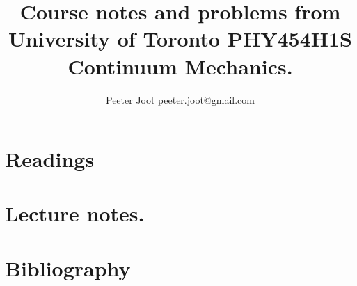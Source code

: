 \documentclass[12pt,leqno]{book}
\begin{document}

\title{Course notes and problems from\\University of Toronto PHY454H1S\\Continuum Mechanics.}
\author{Peeter Joot \quad peeter.joot@gmail.com}

\maketitle

\clearpage{}
\tableofcontents

\clearpage{}

\pagestyle{plain}



\part{Readings}


\part{Lecture notes.}



%
\part{Bibliography}




\end{document}
